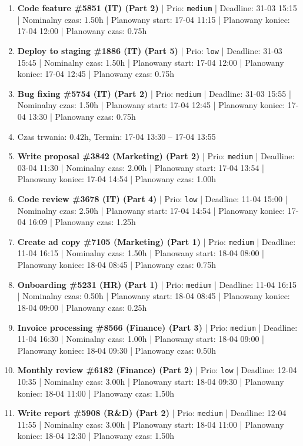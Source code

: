 {\begin{enumerate}
  \item [\textbf{14643}] \textbf{Code feature \#5851 (IT) (Part 2)} | Prio: \texttt{medium} | Deadline: 31-03 15:15 | Nominalny czas: 1.50h | Planowany start: 17-04 11:15 | Planowany koniec: 17-04 12:00 | Planowany czas: 0.75h
  \item [\textbf{14697}] \textbf{Deploy to staging \#1886 (IT) (Part 5)} | Prio: \texttt{low} | Deadline: 31-03 15:45 | Nominalny czas: 1.50h | Planowany start: 17-04 12:00 | Planowany koniec: 17-04 12:45 | Planowany czas: 0.75h
  \item [\textbf{14631}] \textbf{Bug fixing \#5754 (IT) (Part 2)} | Prio: \texttt{medium} | Deadline: 31-03 15:55 | Nominalny czas: 1.50h | Planowany start: 17-04 12:45 | Planowany koniec: 17-04 13:30 | Planowany czas: 0.75h
  \item [\textbf{PRZERWA}] Czas trwania: 0.42h, Termin: 17-04 13:30 -- 17-04 13:55
  \item [\textbf{14673}] \textbf{Write proposal \#3842 (Marketing) (Part 2)} | Prio: \texttt{medium} | Deadline: 03-04 11:30 | Nominalny czas: 2.00h | Planowany start: 17-04 13:54 | Planowany koniec: 17-04 14:54 | Planowany czas: 1.00h
  \item [\textbf{14699}] \textbf{Code review \#3678 (IT) (Part 4)} | Prio: \texttt{low} | Deadline: 11-04 15:00 | Nominalny czas: 2.50h | Planowany start: 17-04 14:54 | Planowany koniec: 17-04 16:09 | Planowany czas: 1.25h
  \item [\textbf{14650}] \textbf{Create ad copy \#7105 (Marketing) (Part 1)} | Prio: \texttt{medium} | Deadline: 11-04 16:15 | Nominalny czas: 1.50h | Planowany start: 18-04 08:00 | Planowany koniec: 18-04 08:45 | Planowany czas: 0.75h
  \item [\textbf{14671}] \textbf{Onboarding \#5231 (HR) (Part 1)} | Prio: \texttt{medium} | Deadline: 11-04 16:15 | Nominalny czas: 0.50h | Planowany start: 18-04 08:45 | Planowany koniec: 18-04 09:00 | Planowany czas: 0.25h
  \item [\textbf{14675}] \textbf{Invoice processing \#8566 (Finance) (Part 3)} | Prio: \texttt{medium} | Deadline: 11-04 16:30 | Nominalny czas: 1.00h | Planowany start: 18-04 09:00 | Planowany koniec: 18-04 09:30 | Planowany czas: 0.50h
  \item [\textbf{14690}] \textbf{Monthly review \#6182 (Finance) (Part 2)} | Prio: \texttt{low} | Deadline: 12-04 10:35 | Nominalny czas: 3.00h | Planowany start: 18-04 09:30 | Planowany koniec: 18-04 11:00 | Planowany czas: 1.50h
  \item [\textbf{14674}] \textbf{Write report \#5908 (R\&D) (Part 2)} | Prio: \texttt{medium} | Deadline: 12-04 11:55 | Nominalny czas: 3.00h | Planowany start: 18-04 11:00 | Planowany koniec: 18-04 12:30 | Planowany czas: 1.50h

\end{enumerate}}
